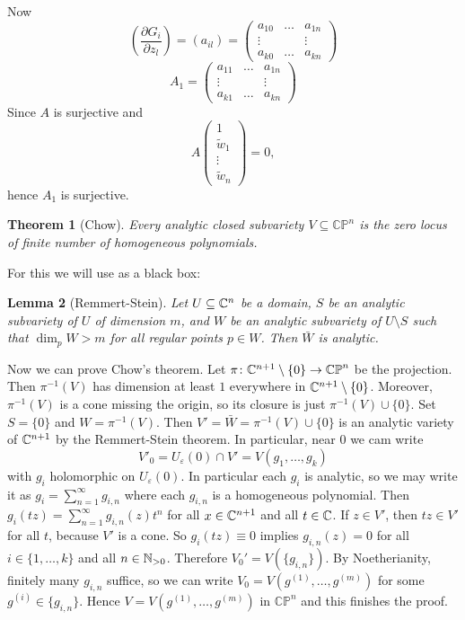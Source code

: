 \documentclass[A4paper, british]{amsart}
\theoremstyle{darkgreentheorem}
\newtheorem{thm}{Theorem}[section]
\newtheorem{lm}[thm]{Lemma}
\theoremstyle{darkbluedefinition}
\theoremstyle{darkredexample}
\theoremstyle{remark}
\newcommand{\CP}{\mathbb{CP}}
\newcommand{\1}{\mathbbm{1}}
\begin{document}
Now
\[(\frac{\partial G_{i}}{\partial z_{l}})=(a_{il})=\begin{pmatrix} a_{10} & \ldots & a_{1n} \\ \vdots & & \vdots \\ a_{k0} & \ldots & a_{kn}\end{pmatrix}\]
\[A_{1}=\begin{pmatrix} a_{11} & \ldots & a_{1n} \\ \vdots & & \vdots \\ a_{k1} & \ldots & a_{kn} \end{pmatrix}\]
Since $A$ is surjective and 
\[A\begin{pmatrix} 1 \\ \tilde{w}_{1} \\ \vdots \\ \tilde{w}_{n}\end{pmatrix}=0,\]
hence $A_{1}$ is surjective.

\begin{thm}[Chow]
    Every analytic closed subvariety $V\subseteq \CP^{n}$ is the zero locus of finite number of homogeneous polynomials.
\end{thm}

For this we will use as a black box:

\begin{lm}[Remmert-Stein]
    Let $U\subseteq \mathbb{C}^{n}$ be a domain, $S$ be an analytic subvariety of $U$ of dimension $m$, and $W$ be an analytic subvariety of $U\setminus S$ such that $\dim_{p}W>m$ for all regular points $p\in W$.
    Then $\bar{W}$ is analytic.
\end{lm}

Now we can prove Chow's theorem.
Let $\pi\colon \C^{n+1}\setminus \{ 0\}\to \CP^{n}$ be the projection.
Then $\pi^{-1}(V)$ has dimension at least $1$ everywhere in $\mathbb{C}^{n+1}\setminus \{0 \}$.
Moreover, $\pi^{-1}(V)$ is a cone missing the origin, so its closure is just $\pi^{-1}(V)\cup \{0\}$.
Set $S=\{0\}$ and $W=\pi^{-1}(V)$. 
Then $V'=\bar{W}=\pi^{-1}(V)\cup \{0\}$ is an analytic variety of $\mathbb{C}^{n+1}$ by the Remmert-Stein theorem.
In particular, near $0$ we cam write
\[ V'_{0}=U_{\varepsilon}(0)\cap V'=V(g_{1},\ldots,g_{k})\]
with $g_{i}$ holomorphic on $U_{\varepsilon }(0)$.
In particular each $g_{i}$ is analytic, so we may write it as $g_{i}=\sum_{n=1}^{\infty} g_{i,n}$ where each $g_{i,n}$ is a homogeneous polynomial.
Then $g_{i}(tz)=\sum_{n=1}^{\infty}g_{i,n}(z)t^{n}$ for all $x\in \mathbb{C}^{n+1}$ and all $t\in \mathbb{C}$.
If $z\in V'$, then $tz\in V'$ for all $t$, because $V'$ is a cone.
So $g_{i}(tz)\equiv 0$ implies $g_{i,n}(z)=0$ for all $i\in \{1,\ldots,k\}$ and all $n\in \mathbb{N}_{>0}$.
Therefore $V_{0}'=V(\{g_{i,n}\})$.
By Noetherianity, finitely many $g_{i,n}$ suffice, so we can write $V_{0}=V(g^{(1)},\ldots, g^{(m)})$ for some $g^{(i)}\in \{g_{i,n}\}$.
Hence $V=V(g^{(1)},\ldots, g^{(m)})$ in $\CP^{n}$ and this finishes the proof.
\end{document}
